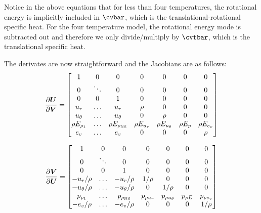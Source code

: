 \documentclass[10pt]{article}
\begin{document}
\begin{flushleft}
Notice in the above equations that for less than four temperatures, the rotational energy is implicitly included in $\cvbar$, which is the translational-rotational specific heat. For the four temperature model, the rotational energy mode is subtracted out and therefore we only divide/multiply by $\cvtbar$, which is the translational specific heat.

The derivates are now straightforward and the Jacobians are as follows: 
\begin{equation*}
    \frac{\partial \boldsymbol{U}}{\partial \boldsymbol{V}} = \begin{bmatrix}
        1 & 0 & 0 & 0 & 0 & 0 & 0 \\
        0 & \ddots & 0 & 0 & 0 & 0 & 0 \\
        0 & 0 & 1 & 0 & 0 & 0 & 0 \\
        u_r & \dots & u_r & \rho & 0 & 0 & 0 \\
        u_\theta & \dots & u_\theta & 0 & \rho & 0 & 0 \\
        \rho E_{\rho_1} & \dots & \rho E_{\rho_\text{NS}} & \rho E_{u_r} & \rho E_{u_\theta} & \rho E_{p} & \rho E_{e_v} \\
        e_v & \dots & e_v & 0 & 0 & 0 & \rho \\
    \end{bmatrix}
\end{equation*}


\begin{equation*}
    \frac{\partial \boldsymbol{V}}{\partial \boldsymbol{U}} = \begin{bmatrix}
        1 & 0 & 0 & 0 & 0 & 0 & 0 \\
        0 & \ddots & 0 & 0 & 0 & 0 & 0 \\
        0 & 0 & 1 & 0 & 0 & 0 & 0 \\
        -u_r / \rho & \dots & -u_r / \rho  & 1 / \rho & 0 & 0 & 0 \\
        -u_\theta / \rho & \dots & -u_\theta / \rho & 0 & 1 / \rho & 0 & 0 \\
        p_{\rho_1} & \dots & p_{\rho_\text{NS}} & p_{\rho u_r} & p_{\rho u_\theta} & p_{\rho E} & p_{\rho e_v}  \\
        -e_v / \rho & \dots & -e_v / \rho & 0 & 0 & 0 & 1 / \rho \\
    \end{bmatrix}
\end{equation*}


\end{flushleft}
\end{document}
